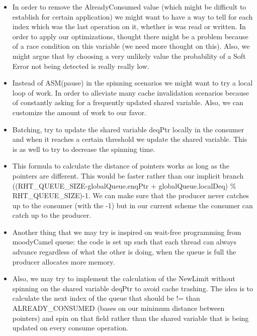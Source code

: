 \begin{itemize}
	\item In order to remove the AlreadyConsumed value (which might be difficult to establish for certain application) we might want to have a way to tell for each index which was the last operation on it, whether is was read or written. In order to apply our optimizations, thought there might be a problem because of a race condition on this variable (we need more thought on this). Also, we might argue that by choosing a very unlikely value the probability of a Soft Error not being detected is really really low. 
    \item Instead of ASM(pause) in the spinning scenarios we might want to try a local loop of work. In order to alleviate many cache invalidation scenarios because of constantly asking for a frequently updated shared variable. Also, we can customize the amount of work to our favor.
    \item Batching, try to update the shared variable deqPtr locally in the consumer and when it reaches a certain threshold we update the shared variable. This is as well to try to decrease the spinning time. 
    \item This formula to calculate the distance of pointers works as long as the pointers are different. This would be faster rather than our implicit branch ((RHT\_QUEUE\_SIZE-globalQueue.enqPtr + globalQueue.localDeq) \% RHT\_QUEUE\_SIZE)-1. We can make sure that the producer never catches up to the consumer (with the -1) but in our current scheme the consumer can catch up to the producer. 
	\item Another thing that we may try is inspired on wait-free programming from moodyCamel queue: the code is set up such
that each thread can always advance regardless of what the other is doing, when the queue is full the producer allocates more memory. 
 	\item Also, we may try to implement the calculation of the NewLimit without spinning on the shared variable deqPtr to avoid cache trashing. The idea is to calculate the next index of the queue that should be != than ALREADY\_CONSUMED (bases on our minimum distance between pointers) and spin on that field rather than the shared variable that is being updated on every consume operation.  
\end{itemize}


























